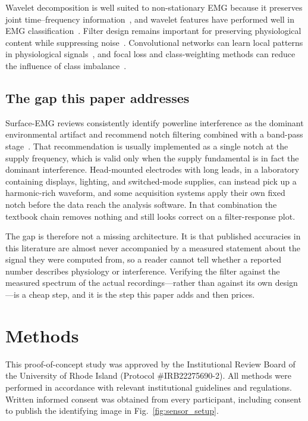 \documentclass[pdflatex,sn-nature,iicol]{sn-jnl}
\begin{document}
Wavelet decomposition is well suited to non-stationary EMG because it preserves joint time--frequency information~\cite{englehart2003robust}, and wavelet features have performed well in EMG classification~\cite{phinyomark2012feature}. Filter design remains important for preserving physiological content while suppressing noise~\cite{chowdhury2013surface}. Convolutional networks can learn local patterns in physiological signals~\cite{faust2018deep,tsinganos2019improved}, and focal loss and class-weighting methods can reduce the influence of class imbalance~\cite{lin2017focal,johnson2019survey}.

\subsection{The gap this paper addresses}

Surface-EMG reviews consistently identify powerline interference as the dominant environmental artifact and recommend notch filtering combined with a band-pass stage~\cite{chowdhury2013surface,raez2006techniques}. That recommendation is usually implemented as a single notch at the supply frequency, which is valid only when the supply fundamental is in fact the dominant interference. Head-mounted electrodes with long leads, in a laboratory containing displays, lighting, and switched-mode supplies, can instead pick up a harmonic-rich waveform, and some acquisition systems apply their own fixed notch before the data reach the analysis software. In that combination the textbook chain removes nothing and still looks correct on a filter-response plot.

The gap is therefore not a missing architecture. It is that published accuracies in this literature are almost never accompanied by a measured statement about the signal they were computed from, so a reader cannot tell whether a reported number describes physiology or interference. Verifying the filter against the measured spectrum of the actual recordings---rather than against its own design---is a cheap step, and it is the step this paper adds and then prices.

\section{Methods}

This proof-of-concept study was approved by the Institutional Review Board of the University of Rhode Island (Protocol \#IRB22275690-2). All methods were performed in accordance with relevant institutional guidelines and regulations. Written informed consent was obtained from every participant, including consent to publish the identifying image in Fig.~\ref{fig:sensor_setup}.
\end{document}
